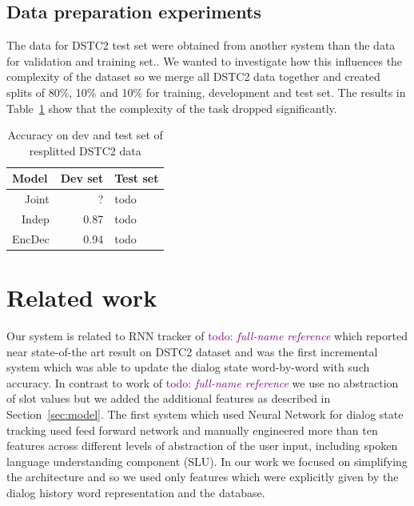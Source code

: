 \documentclass{itatnew}
\def\todo#1{\textcolor{purple}{todo: \textit{#1}}}
\begin{document}
\subsection{Data preparation experiments}
\label{sec:split}
The data for DSTC2 test set were obtained from another system than the data for validation and training set.\cite{henderson2014second}.
We wanted to investigate how this influences the complexity of the dataset so we merge all DSTC2 data together and created splits of 80\%, 10\% and 10\% for training, development and test set.
The results in Table~\ref{tab:resplit} show that the complexity of the task dropped significantly.

\begin{table}
\caption{Accuracy on dev and test set of resplitted DSTC2 data}
\begin{center}
\begin{tabular}{r@{\quad}rll}
\hline
\multicolumn{1}{l}{\rule{0pt}{12pt}
                   Model}&\multicolumn{1}{l}{Dev set}&\multicolumn{2}{l}{Test set}\\[2pt]
\hline\rule{0pt}{12pt}
Joint  &     ?&  todo \\
Indep  &   0.87 & todo \\
EncDec &   0.94 & todo \\
\hline
\end{tabular}
\end{center}
\label{tab:resplit}
\end{table}

\section{Related work}
\label{sec:related}
Our system is related to RNN tracker of \cite{zilka2015incremental}\todo{full-name reference} which reported near state-of-the art result on DSTC2 dataset and was the first incremental system which was able to update the dialog state word-by-word with such accuracy.
In contrast to work of \cite{zilka2015incremental}\todo{full-name reference} we use no abstraction of slot values but we added the additional features as described in Section~\ref{sec:model}.
The first system which used Neural Network for dialog state tracking \cite{henderson2013deep} used feed forward network and manually engineered more than ten features across different levels of abstraction of the user input, including spoken language understanding component (SLU).
In our work we focused on simplifying the architecture and so we used only features which were explicitly given by the dialog history word representation and the database.
\end{document}
